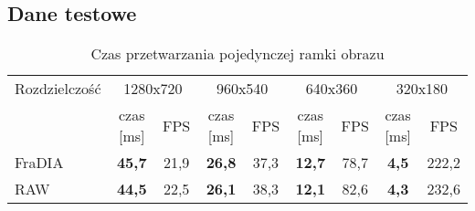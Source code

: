 \documentclass[a4paper,12pt]{article}
\begin{document}
\subsection{Dane testowe}







\begin{table}[h!]
\caption[Zadanie pierwsze -- czas przetwarzania pojedynczej ramki obrazu]{Czas przetwarzania pojedynczej ramki obrazu}
\centering
\begin{tabular}{lcccccccc}
\toprule
Rozdzielczość & \multicolumn{2}{c}{1280x720} & \multicolumn{2}{c}{960x540} & \multicolumn{2}{c}{640x360} & \multicolumn{2}{c}{320x180} \\
\cmidrule(r){2-9}
 & czas [ms] & FPS & czas [ms] & FPS & czas [ms] & FPS & czas [ms] & FPS \\
\midrule
FraDIA & \bf 45,7 & 21,9 & \bf 26,8 & 37,3 & \bf 12,7 & 78,7 & \bf 4,5 & 222,2 \\
RAW    & \bf 44,5 & 22,5 & \bf 26,1 & 38,3 & \bf 12,1 & 82,6 & \bf 4,3 & 232,6 \\
\bottomrule
\end{tabular}
\label{tab:zad_1_wyniki}
\end{table}
\end{document}
